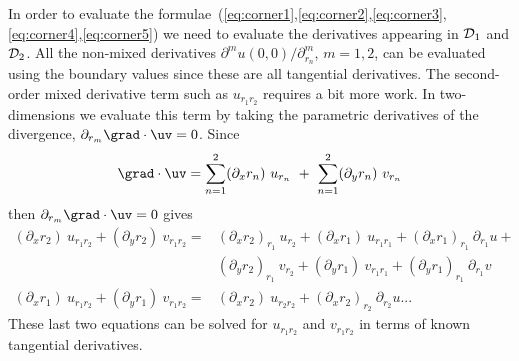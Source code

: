 \documentclass[10pt]{article}
\begin{document}
In order to evaluate the formulae~(\ref{eq:corner1},\ref{eq:corner2},\ref{eq:corner3},
\ref{eq:corner4},\ref{eq:corner5}) we need to evaluate the derivatives appearing in 
${\mathcal D}_1$ and ${\mathcal D}_2$. All the non-mixed derivatives $\partial^m u(0,0)/\partial_{r_n}^m$, $m=1,2$,
can be evaluated using the boundary values since these are all tangential derivatives. 
The second-order mixed derivative term such as $u_{r_1 r_2}$
requires a bit more work. In two-dimensions we evaluate this term by taking the parametric
derivatives of the divergence, $\partial_{r_m} \grad\cdot\uv=0$.
Since
\[
    \grad\cdot\uv = \sum_{n=1}^2 (\partial_x r_n)~ u_{r_n} ~+~  \sum_{n=1}^2 (\partial_y r_n)~v_{r_n}
\]
then $\partial_{r_m} \grad\cdot\uv=0$ gives
\begin{align*}
    (\partial_x r_2) ~ u_{r_1 r_2} + (\partial_y r_2) ~v_{r_1 r_2} =& 
      (\partial_x r_2)_{r_1} ~ u_{r_2} +
      (\partial_x r_1) ~u_{r_1 r_1} + (\partial_x r_1)_{r_1}~\partial_{r_1} u + \\
     & (\partial_y r_2)_{r_1} ~ v_{r_2} +(\partial_y r_1) ~v_{r_1 r_1} + (\partial_y r_1)_{r_1}~\partial_{r_1} v \\
    (\partial_x r_1) ~u_{r_1 r_2}  + (\partial_y r_1) ~v_{r_1 r_2} =& 
        (\partial_x r_2) ~u_{r_2 r_2} + (\partial_x r_2)_{r_2}~\partial_{r_2} u       ... 
\end{align*}
These last two equations can be solved for $u_{r_1 r_2}$ and $v_{r_1 r_2}$
in terms of known tangential derivatives.
\end{document}
